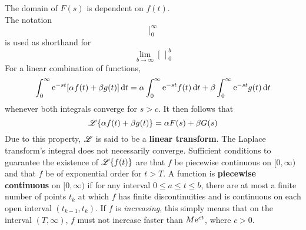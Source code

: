 \documentclass[./Differential Equations.tex]{subfiles}
\begin{document}
			The domain of \(F(s)\) is dependent on \(f(t)\). \\
			The notation
			\[]_0^\infty\]
			is used as shorthand for
			\[\lim_{b\to\infty}[\,]_0^b\]
			For a linear combination of functions,
				\[\int_0^\infty \text{e}^{-st}[\alpha f(t) + \beta g(t)]\dd{t} = \alpha\int_0^\infty \text{e}^{-st}f(t)\dd{t} + \beta\int_0^\infty \text{e}^{-st}g(t)\dd{t}\]
				whenever both integrals converge for \(s > c\). It then follows that
				\[\operatorname{\mathscr{L}}\{\alpha f(t) + \beta g(t)\} = \alpha F(s) + \beta G(s)\]
				Due to this property, \(\operatorname{\mathscr{L}}\) is said to be a \textbf{linear transform}.
			The Laplace transform's integral does not necessarily converge. Sufficient conditions to guarantee the existence of \(\operatorname{\mathscr{L}}\{f(t)\}\) are that \(f\) be piecewise continuous on \([0, \infty)\) and that \(f\) be of exponential order for \(t > T\). A function is \textbf{piecewise continuous} on \([0, \infty)\) if for any interval \(0 \le a \le t \le b\), there are at most a finite number of points \(t_k\) at which \(f\) has finite discontinuities and is continuous on each open interval \((t_{k - 1}, t_k)\).
			If \(f\) is \textit{increasing}, this simply means that on the interval \((T, \infty)\), \(f\) must not increase faster than \(M\text{e}^{ct}\), where \(c > 0\). \\
\end{document}
